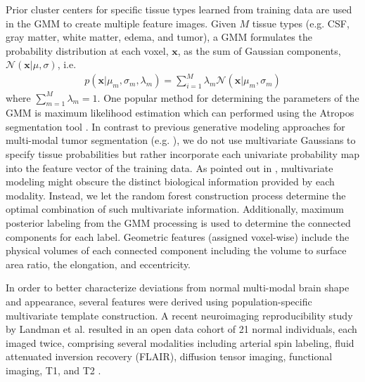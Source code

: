 \documentclass[final,5p,times,twocolumn]{elsarticle}
\begin{document}
Prior  cluster centers for specific tissue types learned from training data \cite{reynolds2009} are used in the GMM to create multiple feature images.  
Given $M$ tissue types (e.g. CSF, gray matter,
white matter, edema, and tumor), a GMM formulates the 
probability distribution at each voxel, $\mathbf{x}$, as the
sum of Gaussian components, $\mathcal{N}(\mathbf{x}|\mu,\sigma)$, i.e.
\begin{align}
p\left(\mathbf{x}|\mu_m,\sigma_m,\lambda_m\right) = \sum_{i=1}^M \lambda_m \mathcal{N}(\mathbf{x}|\mu_m,\sigma_m)
\end{align}
where $\sum_{m=1}^M \lambda_m = 1$.  One popular method for 
determining the parameters of the GMM is maximum likelihood 
estimation which can performed using the Atropos segmentation 
tool \cite{avants2011}.  In contrast to previous generative
modeling approaches for multi-modal tumor segmentation 
(e.g. \cite{prastawa2003,zikic2012}), we do not use multivariate 
Gaussians to specify tissue probabilities but rather incorporate each
univariate probability map into the feature vector of the training
data.  As pointed out in \cite{menze2010}, multivariate modeling
might obscure the distinct biological information provided by each 
modality.  Instead, we let the random forest construction 
process determine the optimal combination of such multivariate
information.
Additionally, maximum posterior labeling from the GMM processing
is used to determine the connected components for each label.  
Geometric features (assigned voxel-wise) include the physical volumes 
of each connected component including the volume to surface area ratio, 
the elongation, and eccentricity. 

In order to better characterize deviations from normal
multi-modal brain shape and appearance, several features were derived 
using population-specific multivariate template 
construction. A recent neuroimaging reproducibility study
by Landman et al. resulted in an open data cohort of 21
normal individuals, each imaged twice, comprising several
modalities including arterial spin labeling, 
fluid attenuated inversion recovery (FLAIR),
diffusion tensor imaging, functional imaging, T1, and T2 
\cite{landman2011}.
\end{document}
